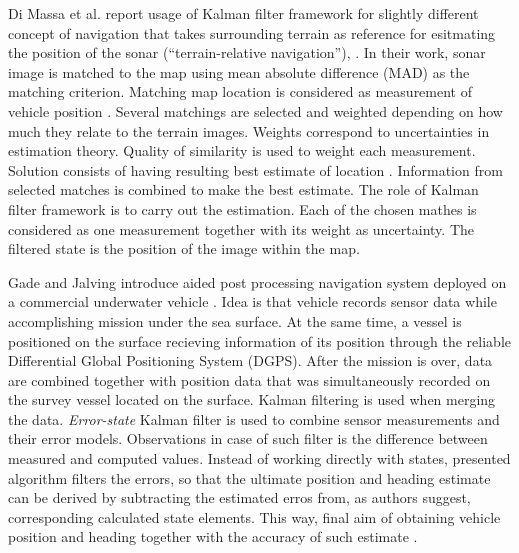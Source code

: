 Di Massa et al. report usage of Kalman filter framework for slightly different concept of navigation that takes surrounding terrain as reference for esitmating the position of the sonar (``terrain-relative navigation''), \cite{diMassa97}. In their work, sonar image is matched to the map using mean absolute difference (MAD) as the matching criterion. Matching map location is considered as measurement of vehicle position \cite{diMassa97}. Several matchings are selected and weighted depending on how much they relate to the terrain images. Weights correspond to uncertainties in estimation theory. Quality of similarity is used to weight each measurement. Solution consists of having resulting best estimate of location \cite{diMassa97}. Information from selected matches is combined to make the best estimate. The role of Kalman filter framework is to carry out the estimation. Each of the chosen mathes is considered as one measurement together with its weight as uncertainty. The filtered state is the position of the image within the map. 

Gade and Jalving introduce aided post processing navigation system deployed on a commercial underwater vehicle \cite{gade99}. Idea is that vehicle records sensor data while accomplishing mission under the sea surface. At the same time, a vessel is positioned on the surface recieving information of its position through the reliable Differential Global Positioning System (DGPS). After the mission is over, data are combined together with position data that was simultaneously recorded on the survey vessel located on the surface. Kalman filtering is used when merging the data. \textit{Error-state} Kalman filter is used to combine sensor measurements and their error models. Observations in case of such filter is the difference between measured and computed values. Instead of working directly with states, presented algorithm filters the errors, so that the ultimate position and heading estimate can be derived by subtracting the estimated erros from, as authors suggest, corresponding calculated state elements. This way, final aim of obtaining vehicle position and heading together with the accuracy of such estimate \cite{gade99}. 

